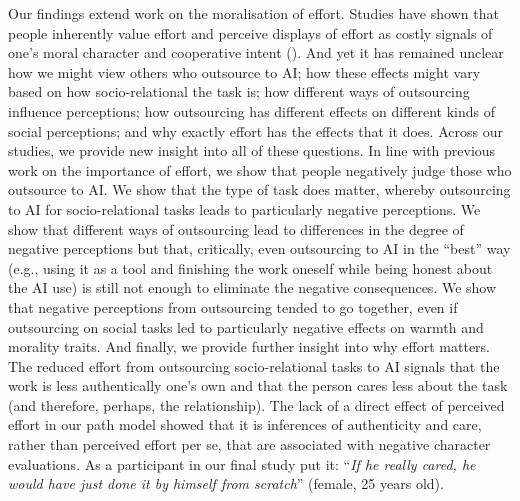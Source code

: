 \documentclass[
  man,
  floatsintext,
  longtable,
  nolmodern,
  notxfonts,
  notimes,
  colorlinks=true,linkcolor=blue,citecolor=blue,urlcolor=blue]{apa7}
\begin{document}
Our findings extend work on the moralisation of effort. Studies have
shown that people inherently value effort and perceive displays of
effort as costly signals of one's moral character and cooperative intent
(). And yet it has
remained unclear how we might view others who outsource to AI; how these
effects might vary based on how socio-relational the task is; how
different ways of outsourcing influence perceptions; how outsourcing has
different effects on different kinds of social perceptions; and why
exactly effort has the effects that it does. Across our studies, we
provide new insight into all of these questions. In line with previous
work on the importance of effort, we show that people negatively judge
those who outsource to AI. We show that the type of task does matter,
whereby outsourcing to AI for socio-relational tasks leads to
particularly negative perceptions. We show that different ways of
outsourcing lead to differences in the degree of negative perceptions
but that, critically, even outsourcing to AI in the ``best'' way (e.g.,
using it as a tool and finishing the work oneself while being honest
about the AI use) is still not enough to eliminate the negative
consequences. We show that negative perceptions from outsourcing tended
to go together, even if outsourcing on social tasks led to particularly
negative effects on warmth and morality traits. And finally, we provide
further insight into why effort matters. The reduced effort from
outsourcing socio-relational tasks to AI signals that the work is less
authentically one's own and that the person cares less about the task
(and therefore, perhaps, the relationship). The lack of a direct effect
of perceived effort in our path model showed that it is inferences of
authenticity and care, rather than perceived effort per se, that are
associated with negative character evaluations. As a participant in our
final study put it: ``\emph{If he really cared, he would have just done
it by himself from scratch}'' (female, 25 years old).
\end{document}
